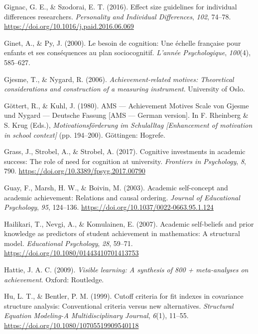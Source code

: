 \documentclass[
  man]{apa6}
\newlength{\cslhangindent}
\newlength{\cslentryspacingunit} %
\newenvironment{CSLReferences}[2] %
 {%
  \setlength{\parindent}{0pt}
  \ifodd #1
  \let\oldpar\par
  \def\par{\hangindent=\cslhangindent\oldpar}
  \fi
  \setlength{\parskip}{#2\cslentryspacingunit}
 }%
 {}
\begin{document}
\begin{CSLReferences}{1}{0}
\leavevmode{}%
Gignac, G. E., \& Szodorai, E. T. (2016). Effect size guidelines for individual differences researchers. \emph{Personality and Individual Differences}, \emph{102}, 74--78. \url{https://doi.org/10.1016/j.paid.2016.06.069}

\leavevmode{}%
Ginet, A., \& Py, J. (2000). Le besoin de cognition: Une {é}chelle fran{ç}aise pour enfants et ses cons{é}quences au plan sociocognitif. \emph{L'ann{é}e Psychologique}, \emph{100}(4), 585--627.

\leavevmode{}%
Gjesme, T., \& Nygard, R. (2006). \emph{Achievement-related motives: Theoretical considerations and construction of a measuring instrument}. University of Oslo.

\leavevmode{}%
Göttert, R., \& Kuhl, J. (1980). AMS --- {A}chievement {M}otives {S}cale von {G}jesme und {N}ygard --- {D}eutsche {F}assung {[}{AMS} --- {G}erman version{]}. In F. Rheinberg \& S. Krug (Eds.), \emph{Motivationsf{ö}rderung im {S}chulalltag {[}{E}nhancement of motivation in school context{]}} (pp. 194--200). G{ö}ttingen: Hogrefe.

\leavevmode{}%
Grass, J., Strobel, A., \& Strobel, A. (2017). Cognitive investments in academic success: The role of need for cognition at university. \emph{Frontiers in Psychology}, \emph{8}, 790. \url{https://doi.org/10.3389/fpsyg.2017.00790}

\leavevmode{}%
Guay, F., Marsh, H. W., \& Boivin, M. (2003). Academic self-concept and academic achievement: Relations and causal ordering. \emph{Journal of Educational Psychology}, \emph{95}, 124--136. \url{https://doi.org/10.1037/0022-0663.95.1.124}

\leavevmode{}%
Hailikari, T., Nevgi, A., \& Komulainen, E. (2007). Academic self-beliefs and prior knowledge as predictors of student achievement in mathematics: A structural model. \emph{Educational Psychology}, \emph{28}, 59--71. \url{https://doi.org/10.1080/01443410701413753}

\leavevmode{}%
Hattie, J. A. C. (2009). \emph{Visible learning: A synthesis of 800 + meta-analyses on achievement}. Oxford: Routledge.

\leavevmode{}%
Hu, L. T., \& Bentler, P. M. (1999). Cutoff criteria for fit indexes in covariance structure analysis: Conventional criteria versus new alternatives. \emph{Structural Equation Modeling-A Multidisciplinary Journal}, \emph{6}(1), 11--55. \url{https://doi.org/10.1080/10705519909540118}


\end{CSLReferences}
\end{document}
